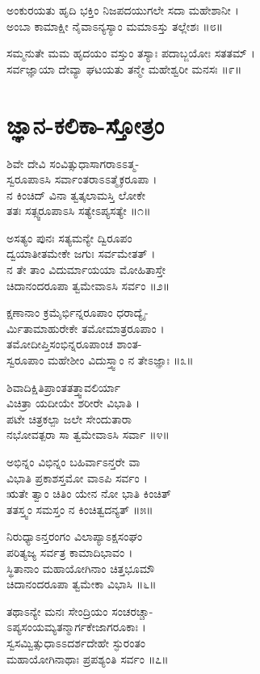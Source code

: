 ಅಂಕುರಯತು ಹೃದಿ ಭಕ್ತಿಂ ನಿಜಪದಯುಗಲೇ ಸದಾ ಮಹೇಶಾನೀ ।\\
ಅಂಬಾ ಕಾಮಾಕ್ಷೀ ನೈವಾಽನ್ಯಸ್ಯಾಂ ಮಮಾಽಸ್ತು ತಲ್ಲೇಶಃ ॥೮॥

ಸಮ್ಮನುತೇ ಮಮ ಹೃದಯಂ ವಸ್ತುಂ ತಸ್ಯಾಃ ಪದಾಬ್ಜಯೋಃ ಸತತಮ್ ।\\
ಸರ್ವಜ್ಞಾಯಾ ದೇವ್ಯಾ ಘಟಯತು ತನ್ಮೇ ಮಹೇಶ್ವರೀ ಮನಸಃ ॥೯॥



\section{ಜ್ಞಾನ-ಕಲಿಕಾ-ಸ್ತೋತ್ರಂ}
ಶಿವೇ ದೇವಿ ಸಂವಿತ್ಸುಧಾಸಾಗರಾಽಽತ್ಮ-\\
ಸ್ವರೂಪಾಽಸಿ ಸರ್ವಾಂತರಾಽಽತ್ಮೈಕರೂಪಾ ।\\
ನ ಕಿಂಚಿದ್ ವಿನಾ ತ್ವತ್ಕಲಾಮಸ್ತಿ ಲೋಕೇ\\
ತತಃ ಸತ್ಸ್ವರೂಪಾಽಸಿ ಸತ್ಯೇಽಪ್ಯಸತ್ಯೇ ॥೧॥

ಅಸತ್ಯಂ ಪುನಃ ಸತ್ಯಮನ್ಯೇ ದ್ವಿರೂಪಂ\\
ದ್ವಯಾತೀತಮೇಕೇ ಜಗುಃ ಸರ್ವಮೇತತ್ ।\\
ನ ತೇ ತಾಂ ವಿದುರ್ಮಾಯಯಾ ಮೋಹಿತಾಸ್ತೇ\\
ಚಿದಾನಂದರೂಪಾ ತ್ವಮೇವಾಽಸಿ ಸರ್ವಂ ॥೨॥

ಕ್ಷಣಾನಾಂ ಕ್ರಮೈರ್ಭಿನ್ನರೂಪಾಂ ಧರಾದ್ಯೈ-\\
ರ್ಮಿತಾಮಾಹುರೇಕೇ ತಮೋಮಾತ್ರರೂಪಾಂ ।\\
ತಮೋದೀಪ್ತಿಸಂಭಿನ್ನರೂಪಾಂಚ ಶಾಂತ-\\
ಸ್ವರೂಪಾಂ ಮಹೇಶೀಂ ವಿದುಸ್ತ್ವಾಂ ನ ತೇಽಜ್ಞಾಃ ॥೩॥

ಶಿವಾದಿಕ್ಷಿತಿಪ್ರಾಂತತತ್ತ್ವಾವಲಿರ್ಯಾ\\
ವಿಚಿತ್ರಾ ಯದೀಯೇ ಶರೀರೇ ವಿಭಾತಿ ।\\
ಪಟೇ ಚಿತ್ರಕಲ್ಪಾ ಜಲೇ ಸೇಂದುತಾರಾ\\
ನಭೋವತ್ಪರಾ ಸಾ ತ್ವಮೇವಾಽಸಿ ಸರ್ವಾ ॥೪॥

ಅಭಿನ್ನಂ ವಿಭಿನ್ನಂ ಬಹಿರ್ವಾಽನ್ತರೇ ವಾ\\
ವಿಭಾತಿ ಪ್ರಕಾಶಸ್ತಮೋ ವಾಽಪಿ ಸರ್ವಂ ।\\
ಋತೇ ತ್ವಾಂ ಚಿತಿಂ ಯೇನ ನೋ ಭಾತಿ ಕಿಂಚಿತ್\\
ತತಸ್ತ್ವಂ ಸಮಸ್ತಂ ನ ಕಿಂಚಿತ್ವದನ್ಯತ್ ॥೫॥

ನಿರುಧ್ಯಾಽನ್ತರಂಗಂ ವಿಲಾಪ್ಯಾಽಕ್ಷಸಂಘಂ\\
ಪರಿತ್ಯಜ್ಯ ಸರ್ವತ್ರ ಕಾಮಾದಿಭಾವಂ ।\\
ಸ್ಥಿತಾನಾಂ ಮಹಾಯೋಗಿನಾಂ ಚಿತ್ತಭೂಮೌ\\
ಚಿದಾನಂದರೂಪಾ ತ್ವಮೇಕಾ ವಿಭಾಸಿ ॥೬॥

ತಥಾಽನ್ಯೇ ಮನಃ ಸೇಂದ್ರಿಯಂ ಸಂಚರಚ್ಚಾ-\\
ಽಪ್ಯಸಂಯಮ್ಯತನ್ಮಾರ್ಗಕೇಜಾಗರೂಕಾಃ ।\\
ಸ್ವಸಮ್ವಿತ್ಸುಧಾಽಽದರ್ಶದೇಹೇ ಸ್ಫುರಂತಂ\\
ಮಹಾಯೋಗಿನಾಥಾಃ ಪ್ರಪಶ್ಯಂತಿ ಸರ್ವಂ ॥೭॥

